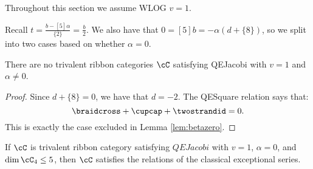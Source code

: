 \documentclass[12pt]{amsart}
\begin{document}
Throughout this section we assume WLOG $v=1$.

Recall $t = \frac{b-[5]\alpha}{\{2\}} = \frac{b}{2}$.  We also have that $0= [5]b = -\alpha (d+\{8\})$, so we split into two cases based on whether $\alpha = 0$.

\begin{lemma}
There are no trivalent ribbon categories $\cC$ satisfying QEJacobi with $v=1$ and $\alpha \neq 0$.
\end{lemma}
\begin{proof}
Since $d+\{8\}=0$, we have that $d=-2$.  The QESquare relation says that:
$$\braidcross + \cupcap + \twostrandid = 0.$$
This is exactly the case excluded in Lemma \ref{lem:betazero}.
\end{proof}

\begin{theorem}
If $\cC$ is trivalent ribbon category satisfying $QEJacobi$ with $v=1$, $\alpha =0$, and $\dim \cC_4 \leq 5$, then $\cC$ satisfies the relations of the classical exceptional series.
\end{theorem}
\end{document}

